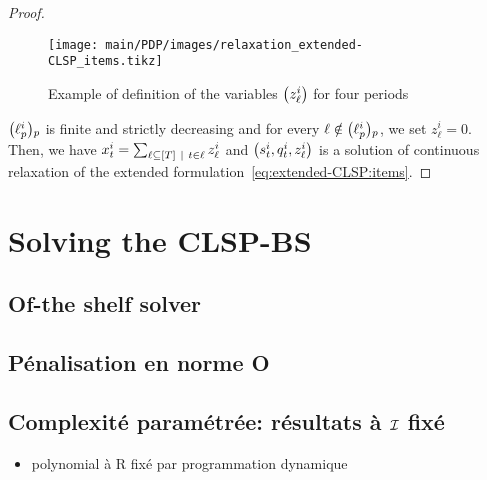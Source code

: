 \begin{proof}
\begin{figure}[h]
  \centering
  \texttt{[image: main/PDP/images/relaxation\_extended-CLSP\_items.tikz]}
  \caption{Example of definition of the variables $\bracket{z_{\ell}^i}$ for four periods}
  \label{fig:relaxation-extended-formulation-by-reference}
\end{figure}

$\bracket{\ell_p^i}_p$ is finite and strictly decreasing and for every $\ell\notin\bracket{\ell_p^i}_p$, we set $z_{\ell}^i=0$. Then, we have $\setup_t^i = \sum_{\ell\subseteq\range{\horizon}~|~t\in\ell} z_{\ell}^i$ and $\bracket{\inventory_t^i, \quantity_t^i, z_{\ell}^i}$ is a solution of continuous relaxation of the extended formulation~\eqref{eq:extended-CLSP:items}.
\end{proof}


\section{Solving the CLSP-BS}
\label{sec:PDP:deterministic:solving}

\subsection{Of-the shelf solver}


\subsection{Pénalisation en norme O}



\subsection{Complexité paramétrée: résultats à $\mathcal{I}$ fixé}


\begin{itemize}
  \item polynomial à R fixé par programmation dynamique
\end{itemize}

